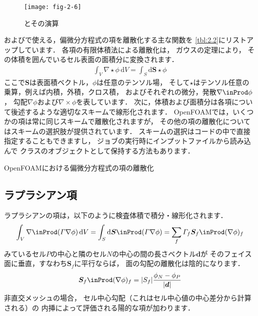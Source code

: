 \begin{figure}[ht]
 \texttt{[image: fig-2-6]}
 \caption{とその演算}
 \label{fig:2.6}
\end{figure}


% 
% 
% 
% 
およびで使える，偏微分方程式の項を離散化する主な関数を
\autoref{tbl:2.2}にリストアップしています．
各項の有限体積法による離散化は，
%  
ガウスの定理により，
その体積を囲んでいるセル表面の面積分に変換されます．
\begin{align}
 \label{eq:2.13}
 \int_{V}\nabla \star \phi\,\mathrm{d}V
 = \int_{S}\mathrm{d}\bm{S} \star \phi
\end{align}
ここで$\bm{S}$は表面積ベクトル，$\phi$は任意のテンソル場，
そして$\star$はテンソル任意の乗算，例えば内積，外積，クロス積，
およびそれぞれの微分，発散$\nabla \inProd \phi$，
勾配$\nabla\phi$および$\nabla \times \phi$を表しています．
次に，体積および面積分は各項について後述するような適切なスキームで線形化されます．
OpenFOAMでは，いくつかの項は常に同じスキームで離散化されますが，
その他の項の離散化についてはスキームの選択肢が提供されています．
スキームの選択はコードの中で直接指定することもできますし，
ジョブの実行時にインプットファイルから読み込んで
% 
% 
クラスのオブジェクトとして保持する方法もあります．


\begin{table}[ht]
 
 \caption{OpenFOAMにおける偏微分方程式の項の離散化}
 \label{tbl:2.2}
\end{table}


\subsection{ラプラシアン項}
\label{ssec:2.4.1}
%  
ラプラシアンの項は，以下のように検査体積で積分・線形化されます．
\begin{align}
 \label{eq:2.14}
 \int_{V}\nabla \inProd (\varGamma\nabla\phi)\,\mathrm{d}V
 = \int_{S}\mathrm{d}\bm{S} \inProd (\varGamma\nabla\phi)
 = \sum_{f}\varGamma_{f}\bm{S}_{f} \inProd (\nabla\phi)_{f}
\end{align}
みているセル$P$の中心と隣のセル$N$の中心の間の長さベクトル$\bm{d}$が
そのフェイス面に垂直，すなわち$\bm{S}_{f}$に平行ならば，
面の勾配の離散化は陰的になります．
\begin{align}
 \label{eq:2.15}
 \bm{S}_{f} \inProd (\nabla\phi)_{f}
 = |S_{f}|\frac{\phi_{N} - \phi_{P}}{|\bm{d}|}
\end{align}
非直交メッシュの場合，
セル中心勾配（これはセル中心値の中心差分から計算される）の
内挿によって評価される陽的な項が加わります．


